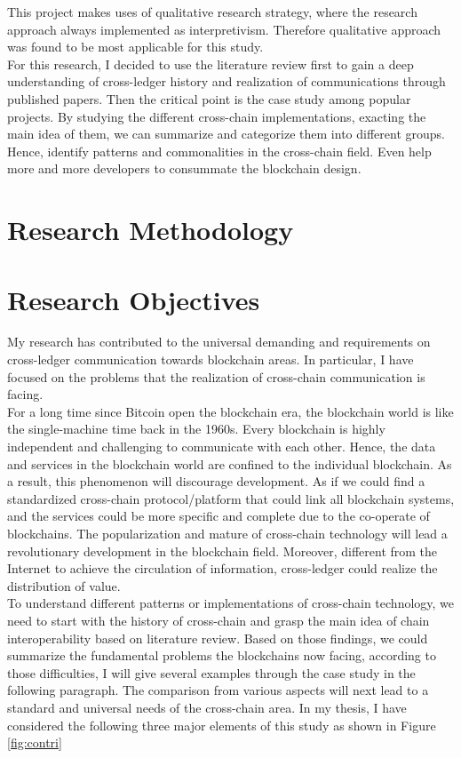 \noindent This project makes uses of qualitative research strategy, where the research approach always implemented as interpretivism. Therefore qualitative approach was found to be most applicable for this study.\\

\noindent For this research, I decided to use the literature review first to gain a deep understanding of cross-ledger history and realization of communications through published papers. Then the critical point is the case study among popular projects. By studying the different cross-chain implementations, exacting the main idea of them, we can summarize and categorize them into different groups. Hence, identify patterns and commonalities in the cross-chain field. Even help more and more developers to consummate the blockchain design.

\section{Research Methodology}

\section{Research Objectives}

\noindent My research has contributed to the universal demanding and requirements on cross-ledger communication towards blockchain areas. In particular, I have focused on the problems that the realization of cross-chain communication is facing.\\

\noindent For a long time since Bitcoin open the blockchain era, the blockchain world is like the single-machine time back in the 1960s. Every blockchain is highly independent and challenging to communicate with each other. Hence, the data and services in the blockchain world are confined to the individual blockchain. As a result, this phenomenon will discourage development. As if we could find a standardized cross-chain protocol/platform that could link all blockchain systems, and the services could be more specific and complete due to the co-operate of blockchains. The popularization and mature of cross-chain technology will lead a revolutionary development in the blockchain field. Moreover, different from the Internet to achieve the circulation of information, cross-ledger could realize the distribution of value.\\

\noindent To understand different patterns or implementations of cross-chain technology, we need to start with the history of cross-chain and grasp the main idea of chain interoperability based on literature review. Based on those findings, we could summarize the fundamental problems the blockchains now facing, according to those difficulties, I will give several examples through the case study in the following paragraph.  The comparison from various aspects will next lead to a standard and universal needs of the cross-chain area. In my thesis, I have considered the following three major elements of this study as shown in Figure \ref{fig:contri}


